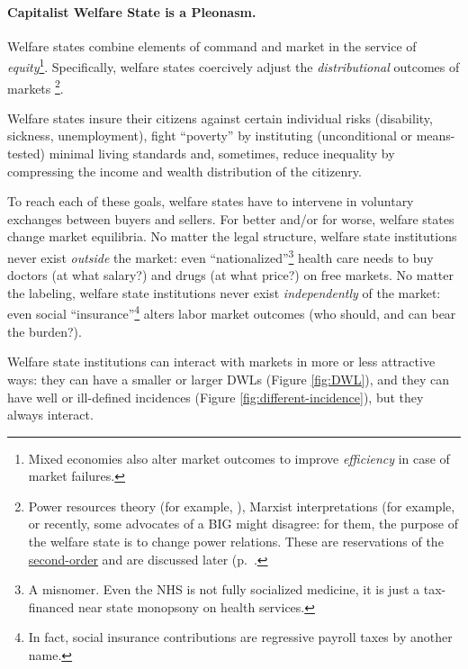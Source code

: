 \paragraph{Capitalist Welfare State is a Pleonasm.}  \label{sec:interface} Welfare states combine elements of  command and market in the service of \emph{equity}\footnote
	{Mixed economies also alter market outcomes to improve \emph{efficiency} in case of market failures.}.
Specifically, welfare states coercively adjust the \emph{distributional} outcomes of markets \footnote
	{Power resources theory (for example, \citealt{Korpi2003}), Marxist interpretations (for example, \cite{Offe1972} or recently, some advocates of a \gls{BIG} might disagree: for them, the purpose of the welfare state is to change power relations. These are reservations of the \hyperref[sec:who-dunnit]{second-order} and are discussed later (p.~\pageref{sec:who-dunnit}.}.

Welfare states insure their citizens against certain individual risks (disability, sickness, unemployment), fight ``poverty'' by instituting (unconditional or means-tested) minimal living standards and, sometimes, reduce inequality by compressing the income and wealth distribution of the citizenry.

To reach each of these goals, welfare states have to intervene in voluntary exchanges between buyers and sellers. For better and/or for worse, welfare states change market equilibria. No matter the legal structure, welfare state institutions never exist \emph{outside} the market: even ``nationalized''\footnote
	{A misnomer. Even the \gls{NHS} is not fully socialized medicine, it is just a tax-financed near state monopsony on health services.}
health care needs to buy doctors (at what salary?) and drugs (at what price?) on free markets. No matter the labeling, welfare state institutions never exist \emph{independently} of the market: even social ``insurance''\footnote
	{In fact, social insurance contributions are regressive payroll taxes by another name.} alters labor market outcomes (who should, and can bear the burden?).

Welfare state institutions can interact with markets in more or less attractive ways: they can have a smaller or larger \glspl{DWL} (Figure \ref{fig:DWL}), and they can have well or ill-defined incidences (Figure \ref{fig:different-incidence}), but they always interact.%


